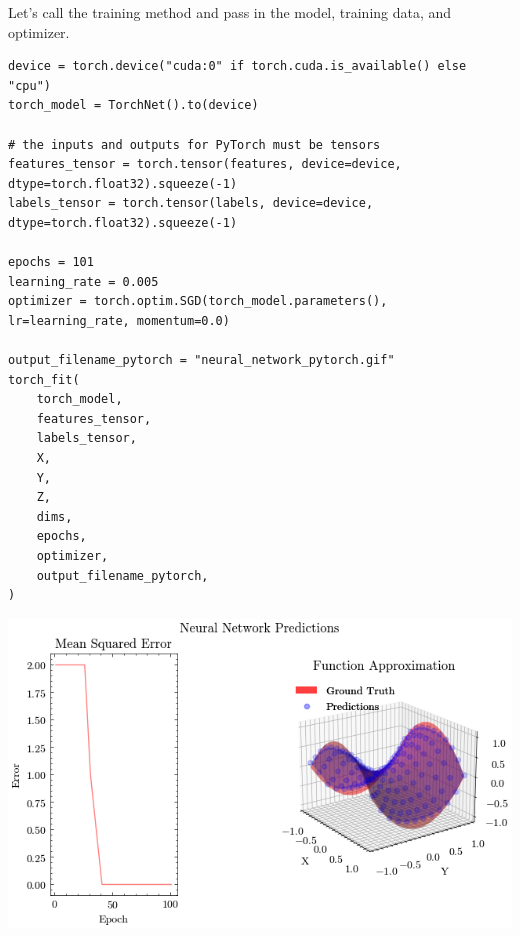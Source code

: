 \documentclass[openany]{book}
\begin{document}
    Let's call the training method and pass in the model, training data, and
optimizer.

\begin{tcolorbox}
\tiny
\begin{verbatim}
device = torch.device("cuda:0" if torch.cuda.is_available() else "cpu")
torch_model = TorchNet().to(device)

# the inputs and outputs for PyTorch must be tensors
features_tensor = torch.tensor(features, device=device, dtype=torch.float32).squeeze(-1)
labels_tensor = torch.tensor(labels, device=device, dtype=torch.float32).squeeze(-1)

epochs = 101
learning_rate = 0.005
optimizer = torch.optim.SGD(torch_model.parameters(), lr=learning_rate, momentum=0.0)

output_filename_pytorch = "neural_network_pytorch.gif"
torch_fit(
    torch_model,
    features_tensor,
    labels_tensor,
    X,
    Y,
    Z,
    dims,
    epochs,
    optimizer,
    output_filename_pytorch,
)
\end{verbatim}
\end{tcolorbox}

    \begin{center}
    \includegraphics[width=\textwidth]{combined_files/combined_200_1.png}
    \end{center}
    { \hspace*{\fill} \\}


    

    
    
\end{document}
